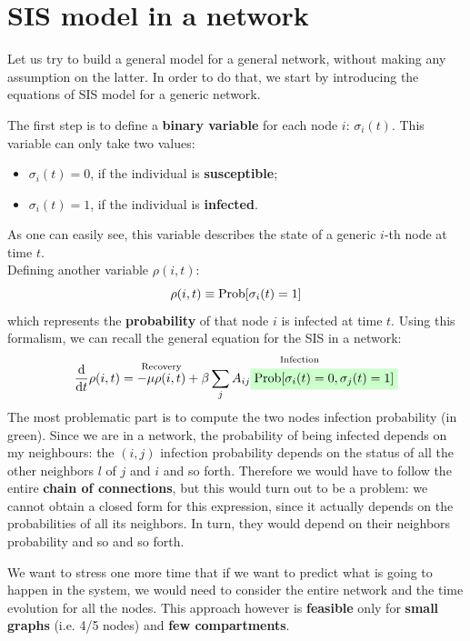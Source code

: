 \documentclass[../main/main.tex]{subfiles}
\begin{document}
\section{SIS model in a network}
Let us try to build a general model for a general network, without making any assumption on the latter. In order to do that, we start by introducing the equations of SIS model for a generic network.

The first step is to define a \textbf{binary variable} for each node \( i \): \( \sigma _i (t) \). This variable can only take two values:
\begin{itemize}
\item \( \sigma _i (t) = 0 \), if the individual is \textbf{susceptible};
\item \( \sigma _i (t) = 1 \), if the individual is \textbf{infected}.
\end{itemize}
As one can easily see, this variable describes the state of a generic $i$-th node at time $t$.\\
Defining another variable \( \rho (i,t) \):
\begin{equation*}
  \rho (i,t) \equiv \text{Prob} \qty[\sigma _i (t) = 1]
\end{equation*}
which represents the \textbf{probability} of that node \( i \) is infected at time \( t \).
Using this formalism, we can recall the general equation for the SIS in a network:
\begin{equation}
  \dv{}{t} \rho (i,t) = \overset{\text{Recovery}}{- \mu  \rho (i,t)} + \overset{\text{Infection}}{\beta \sum_{j}^{} A_{ij} \mathcolorbox{green!20}{\text{Prob} [\sigma _i (t) = 0, \sigma _j (t ) =1 ]   }}
\end{equation}
The most problematic part is to compute the two nodes infection probability (in green). Since we are in a network, the probability of being infected depends on my neighbours: the \( (i,j) \) infection probability depends on the status of all the other neighbors \( l \) of \( j \) and \( i \) and so forth.
Therefore we would have to follow the entire \textbf{chain of connections}, but this would turn out to be a problem: we cannot obtain a closed form for this expression, since it actually depends on the probabilities of all its neighbors. In turn, they would depend on their neighbors probability and so and so forth.

We want to stress one more time that if we want to predict what is going to happen in the system, we would need to consider the entire network and the time evolution for all the nodes. This approach however is \textbf{feasible} only for \textbf{small graphs} (i.e. 4/5 nodes) and \textbf{few compartments}.
\end{document}
